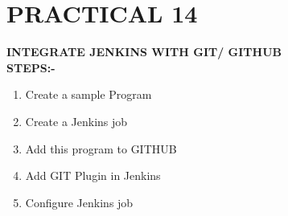 \documentclass[12pt]{article}
\begin{document}
\clearpage

\section{PRACTICAL 14}

\textbf{\uppercase {Integrate Jenkins with GIT/ GITHUB}} 
\vspace{0.1\baselineskip} \\

\textbf{STEPS:-}\\
\begin{enumerate}
\item Create a sample Program
\item Create a Jenkins job
\item Add this program to GITHUB
\item Add GIT Plugin in Jenkins
\item Configure Jenkins job
\end{enumerate}
\end{document}
